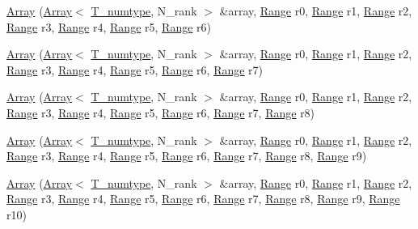 \begin{DoxyCompactItemize}
\item 
\hyperlink{classArray_a2845c57182d32e786b2be49b887b2a7d}{Array} (\hyperlink{classArray}{Array}$<$ \hyperlink{classArray_ae72770f4a1d2f8b7193badafc320f008}{T\+\_\+numtype}, N\+\_\+rank $>$ \&array, \hyperlink{classRange}{Range} r0, \hyperlink{classRange}{Range} r1, \hyperlink{classRange}{Range} r2, \hyperlink{classRange}{Range} r3, \hyperlink{classRange}{Range} r4, \hyperlink{classRange}{Range} r5, \hyperlink{classRange}{Range} r6)
\item 
\hyperlink{classArray_a6d92e3e7d8efe7343f44659b77bcfcfa}{Array} (\hyperlink{classArray}{Array}$<$ \hyperlink{classArray_ae72770f4a1d2f8b7193badafc320f008}{T\+\_\+numtype}, N\+\_\+rank $>$ \&array, \hyperlink{classRange}{Range} r0, \hyperlink{classRange}{Range} r1, \hyperlink{classRange}{Range} r2, \hyperlink{classRange}{Range} r3, \hyperlink{classRange}{Range} r4, \hyperlink{classRange}{Range} r5, \hyperlink{classRange}{Range} r6, \hyperlink{classRange}{Range} r7)
\item 
\hyperlink{classArray_ac246270b9040a13168fac24db54a35dc}{Array} (\hyperlink{classArray}{Array}$<$ \hyperlink{classArray_ae72770f4a1d2f8b7193badafc320f008}{T\+\_\+numtype}, N\+\_\+rank $>$ \&array, \hyperlink{classRange}{Range} r0, \hyperlink{classRange}{Range} r1, \hyperlink{classRange}{Range} r2, \hyperlink{classRange}{Range} r3, \hyperlink{classRange}{Range} r4, \hyperlink{classRange}{Range} r5, \hyperlink{classRange}{Range} r6, \hyperlink{classRange}{Range} r7, \hyperlink{classRange}{Range} r8)
\item 
\hyperlink{classArray_a9813f50a7920f623e3e190145347d1a2}{Array} (\hyperlink{classArray}{Array}$<$ \hyperlink{classArray_ae72770f4a1d2f8b7193badafc320f008}{T\+\_\+numtype}, N\+\_\+rank $>$ \&array, \hyperlink{classRange}{Range} r0, \hyperlink{classRange}{Range} r1, \hyperlink{classRange}{Range} r2, \hyperlink{classRange}{Range} r3, \hyperlink{classRange}{Range} r4, \hyperlink{classRange}{Range} r5, \hyperlink{classRange}{Range} r6, \hyperlink{classRange}{Range} r7, \hyperlink{classRange}{Range} r8, \hyperlink{classRange}{Range} r9)
\item 
\hyperlink{classArray_a919bc6fe9f1c4bb8f623b0b2a58873e0}{Array} (\hyperlink{classArray}{Array}$<$ \hyperlink{classArray_ae72770f4a1d2f8b7193badafc320f008}{T\+\_\+numtype}, N\+\_\+rank $>$ \&array, \hyperlink{classRange}{Range} r0, \hyperlink{classRange}{Range} r1, \hyperlink{classRange}{Range} r2, \hyperlink{classRange}{Range} r3, \hyperlink{classRange}{Range} r4, \hyperlink{classRange}{Range} r5, \hyperlink{classRange}{Range} r6, \hyperlink{classRange}{Range} r7, \hyperlink{classRange}{Range} r8, \hyperlink{classRange}{Range} r9, \hyperlink{classRange}{Range} r10)

\end{DoxyCompactItemize}
